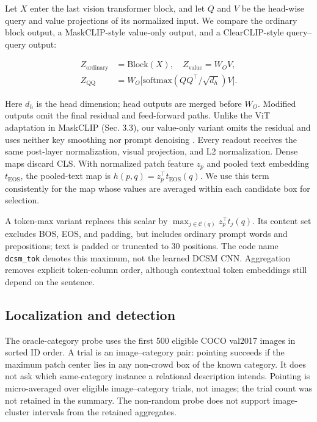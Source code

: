 \documentclass[10pt,twocolumn,letterpaper]{article}
\begin{document}
Let \(X\) enter the last vision transformer block, and let \(Q\) and
\(V\) be the head-wise query and value projections of its normalized
input. We compare the ordinary block output, a MaskCLIP-style value-only
output, and a ClearCLIP-style query--query output:

\[
\begin{aligned}
Z_{\mathrm{ordinary}}&=\mathrm{Block}(X),\quad Z_{\mathrm{value}}=W_O V,\\
Z_{\mathrm{QQ}}&=W_O\big[\mathrm{softmax}(QQ^\top/\sqrt{d_h})V\big].
\end{aligned}
\]

Here \(d_h\) is the head dimension; head outputs are merged before
\(W_O\). Modified outputs omit the final residual and feed-forward
paths. Unlike the ViT adaptation in MaskCLIP (Sec. 3.3), our value-only
variant omits the residual and uses neither key smoothing nor prompt
denoising \citep{zhou2021maskclip}. Every readout receives the same
post-layer normalization, visual projection, and L2 normalization. Dense
maps discard CLS. With normalized patch feature \(z_p\) and pooled text
embedding \(t_{\mathrm{EOS}}\), the pooled-text map is
\(h(p,q)=z_p^\top t_{\mathrm{EOS}}(q)\). We use this term consistently
for the map whose values are averaged within each candidate box for
selection.

A token-max variant replaces this scalar by
\(\max_{j\in\mathcal C(q)}z_p^\top t_j(q)\). Its content set excludes
BOS, EOS, and padding, but includes ordinary prompt words and
prepositions; text is padded or truncated to 30 positions. The code name
\texttt{dcsm\_tok} denotes this maximum, not the learned DCSM CNN.
Aggregation removes explicit token-column order, although contextual
token embeddings still depend on the sentence.

\subsection{Localization and
detection}\label{localization-and-detection}

The oracle-category probe uses the first 500 eligible COCO val2017
images in sorted ID order. A trial is an image--category pair: pointing
succeeds if the maximum patch center lies in any non-crowd box of the
known category. It does not ask which same-category instance a
relational description intends. Pointing is micro-averaged over eligible
image--category trials, not images; the trial count was not retained in
the summary. The non-random probe does not support image-cluster
intervals from the retained aggregates.
\end{document}
